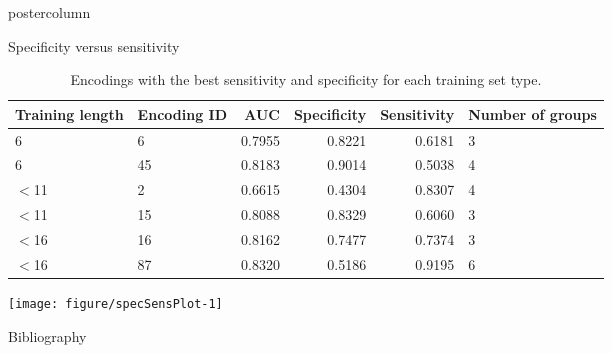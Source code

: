 \documentclass[final]{beamer}\usepackage[]{graphicx}\usepackage[]{color}
\makeatletter
\def\maxwidth{ %
  \ifdim\Gin@nat@width>\linewidth
    \linewidth
  \else
    \Gin@nat@width
  \fi
}
\newenvironment{knitrout}{}{} %
\makeatother
\begin{document}
\begin{frame}
\begin{columns}
\begin{column}{.49\textwidth}
\begin{beamercolorbox}[center,wd=\textwidth]{postercolumn}
\begin{minipage}[T]{.95\textwidth}
{\begin{block}{Specificity versus sensitivity}
\begin{table}[ht]
\centering
\begin{tabular}{llrrrl}
  \toprule
Training length & Encoding ID & AUC & Specificity & Sensitivity & Number of groups \\ 
  \midrule
6 & 6 & 0.7955 & 0.8221 & 0.6181 & 3 \\ 
   \rowcolor[gray]{0.75}6 & 45 & 0.8183 & 0.9014 & 0.5038 & 4 \\ 
  $<$11 & 2 & 0.6615 & 0.4304 & 0.8307 & 4 \\ 
   \rowcolor[gray]{0.75}$<$11 & 15 & 0.8088 & 0.8329 & 0.6060 & 3 \\ 
  $<$16 & 16 & 0.8162 & 0.7477 & 0.7374 & 3 \\ 
   \rowcolor[gray]{0.75}$<$16 & 87 & 0.8320 & 0.5186 & 0.9195 & 6 \\ 
   \bottomrule
\end{tabular}
\caption{Encodings with the best sensitivity and specificity for each training set type.} 
\end{table}


\begin{knitrout}
\color{fgcolor}
\texttt{[image: figure/specSensPlot-1]} 

\end{knitrout}

\end{block}
\vfill

\begin{block}{Bibliography}
  \tiny{
  
  
  }
  \end{block}
  \vfill

}
\end{minipage}
\end{beamercolorbox}
\end{column}
\end{columns}  
\end{frame}
\end{document}
